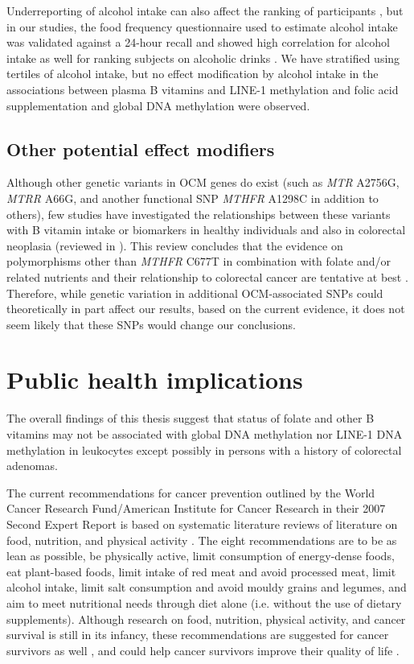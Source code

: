 \noindent Underreporting of alcohol intake can also affect the ranking of participants \cite{c782}, but in our studies, the food frequency questionnaire used to estimate alcohol intake was validated against a 24-hour recall and showed high correlation for alcohol intake \cite{c783} as well for ranking subjects on alcoholic drinks \cite{c784}. We have stratified using tertiles of alcohol intake, but no effect modification by alcohol intake in the associations between plasma B vitamins and LINE-1 methylation and folic acid supplementation and global DNA methylation were observed. 
 
\subsection{Other potential effect modifiers} %
\noindent Although other genetic variants in OCM genes do exist (such as \emph{MTR} A2756G, \emph{MTRR} A66G, and another functional SNP \emph{MTHFR} A1298C in addition to others), few studies have investigated the relationships between these variants with B vitamin intake or biomarkers in healthy individuals and also in colorectal neoplasia (reviewed in \cite{c785}). This review concludes that the evidence on polymorphisms other than \emph{MTHFR} C677T in combination with folate and/or related nutrients and their relationship to colorectal cancer are tentative at best \cite{c785}. Therefore, while genetic variation in additional OCM-associated SNPs could theoretically in part affect our results, based on the current evidence, it does not seem likely that these SNPs would change our conclusions. 
 
\section[]{Public health implications} %
\noindent The overall findings of this thesis suggest that status of folate and other B vitamins may not be associated with global  DNA methylation nor LINE-1 DNA methylation in leukocytes except possibly in persons with a history of colorectal adenomas. 
 
\noindent The current recommendations for cancer prevention outlined by the World Cancer Research Fund/American Institute for Cancer Research in their 2007 Second Expert Report is based on systematic literature reviews of literature on food, nutrition, and physical activity \cite{c786}. The eight recommendations are to be as lean as possible, be physically active, limit consumption of energy-dense foods, eat plant-based foods, limit intake of red meat and avoid processed meat, limit alcohol intake, limit salt consumption and avoid mouldy grains and legumes, and aim to meet nutritional needs through diet alone (i.e. without the use of dietary supplements). Although research on food, nutrition, physical activity, and cancer survival is still in its infancy, these recommendations are suggested for cancer survivors as well \cite{c786}, and could help cancer survivors improve their quality of life \cite{c787}. 
 
